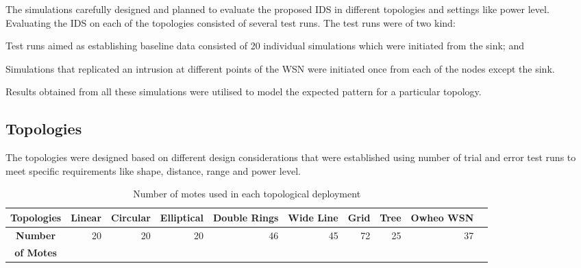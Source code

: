 \documentclass[conference,final]{IEEEtran}
\newcommand*{\bd}[1]{\multicolumn{1}{|c}{\bfseries #1}}
\begin{document}
The simulations carefully designed and planned to evaluate the proposed IDS in different topologies and settings like power level.
Evaluating the IDS on each of the topologies consisted of several test runs.
The test runs were of two kind: 
\begin{inparaenum}
\item Test runs aimed as establishing baseline data consisted of 20 individual simulations which were initiated from the sink; and
\item Simulations that replicated an intrusion at different points of the WSN were initiated once from each of the nodes except the sink.
\end{inparaenum}
Results obtained from all these simulations were utilised to model the expected pattern for a particular topology.

\subsection*{Topologies}
\label{subsec:topos}
The topologies were designed based on different design considerations that were established using number of trial and error test runs to meet specific requirements like shape, distance, range and power level. 

\begin{table}[t!]
\centering
\begin{tabular}{|l|*{8}{r|}r}
\hline
\bd{Topologies}           & \bd{Linear} & \bd{Circular} & \bd{Elliptical} & \bd{Double Rings} & \bd{Wide Line} & \bd{Grid} & \bd{Tree} & \bd{Owheo WSN}   \\
\hline
\bd{Number}           & 20 & 20 & 20 & 46 & 45 & 72 & 25 & 37   \\
 \bd{of Motes}           &  &  &  &  &  &  &  &    \\
\hline
\end{tabular}
\caption{Number of motes used in each topological deployment}
\label{tab:topos}
\end{table}
\end{document}

